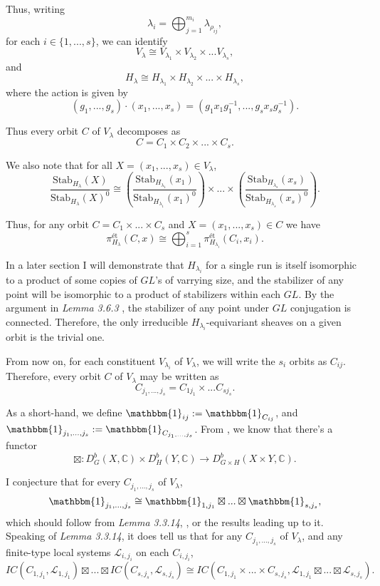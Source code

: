 \documentclass{memoir}
\newcommand{\mc}{\mathcal}
\newcommand{\lb}{\left(}
\newcommand{\rb}{\right)}
\newcommand{\bc}{\mathbb{C}}
\newcommand{\tx}{\text}
\theoremstyle{definition}
\begin{document}
	Thus, writing 
	$$\lambda_i=\bigoplus_{j=1}^{m_i}\lambda_{\rho_{ij}},$$
	for each $i\in\{1, ..., s\}$, we can identify
	$$V_\lambda\cong V_{\lambda_1}\times V_{\lambda_2}\times... V_{\lambda_s},$$
	and 
	$$H_\lambda\cong H_{\lambda_1}\times H_{\lambda_2}\times... \times H_{\lambda_s},$$
	where the action is given by 
	$$(g_1, ..., g_s)\cdot(x_1, ..., x_s)=(g_1x_1g_1^{-1}, ..., g_sx_sg_s^{-1}).$$
	
	Thus every orbit $C$ of $V_\lambda$ decomposes as 
	$$C=C_1\times C_2\times... \times C_s.$$
	
	We also note that for all $X=(x_1, ..., x_s)\in V_\lambda$,
	$$\frac{\tx{Stab}_{H_\lambda}(X)}{\tx{Stab}_{H_\lambda}(X)^0}\cong\lb \frac{\tx{Stab}_{H_{\lambda_1}}(x_1)}{\tx{Stab}_{H_{\lambda_1}}(x_1)^0}\rb\times...\times\lb \frac{\tx{Stab}_{H_{\lambda_s}}(x_s)}{\tx{Stab}_{H_{\lambda_s}}(x_s)^0}\rb.$$
	
	Thus, for any orbit $C=C_1\times... \times C_s$ and $X=(x_1, ..., x_s)\in C$ we have
	$$\pi_{H_\lambda}^{\tx{\'et}}(C, x)\cong \bigoplus_{i=1}^s\pi_{H_{\lambda_i}}^{\tx{\'et}}(C_i, x_i).$$
	
	In a later section I will demonstrate that $H_{\lambda_i}$ for a single run is itself isomorphic to a product of some copies of $GL$'s of varrying size, and the stabilizer of any point will be isomorphic to a product of stabilizers within each $GL$.  
	By the argument in \emph{Lemma 3.6.3} \cite{Chr}, the stabilizer of any point under $GL$ conjugation is connected. 
	Therefore, the only irreducible $H_{\lambda_i}$-equivariant sheaves on a given orbit is the trivial one. 
	
	From now on, for each constituent $V_{\lambda_i}$ of $V_\lambda$, we will write the $s_i$ orbits as $C_{ij}$.  
	Therefore, every orbit $C$ of $V_\lambda$ may be written as
	$$C_{j_1,..., j_s}=C_{1j_1}\times... C_{sj_s}.$$
	
	As a short-hand, we define $\mathbbm{1}_{ij}:=\mathbbm{1}_{C_{ij}}$, and $\mathbbm{1}_{j_1, ..., j_s}:=\mathbbm{1}_{C_{j_1, ..., j_s}}$.   
	From \cite{Ach}, we know that there's a functor 
	$$\boxtimes:D_G^b(X, \bc)\times D_H^b(Y, \bc)\to D_{G\times H}^b(X\times Y, \bc).$$
	
	I conjecture that for every $C_{j_1, ..., j_s}$ of $V_\lambda$,
	$$\mathbbm{1}_{j_1, ..., j_s}\cong\mathbbm{1}_{1,j_1}\boxtimes... \boxtimes\mathbbm{1}_{s,j_s},$$
	which should follow from \emph{Lemma 3.3.14}, \cite{Ach}, or the results leading up to it.  
	Speaking of \emph{Lemma 3.3.14}, it does tell us that for any $C_{j_1,..., j_s}$ of $V_\lambda$, and any finite-type local systems $\mc{L}_{i,j_i}$ on each $C_{i,j_i}$,
	$$IC(C_{1,j_1}, \mc{L}_{1,j_1})\boxtimes... \boxtimes IC(C_{s,j_s}, \mc{L}_{s,j_s})\cong IC(C_{1,j_1}\times... \times C_{s,j_s}, \mc{L}_{1,j_1}\boxtimes... \boxtimes\mc{L}_{s,j_s}).$$
	
\end{document}
